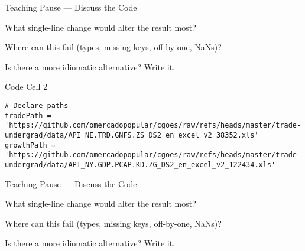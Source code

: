 \documentclass[notes,11pt, aspectratio=169, xcolor=table]{beamer}
\newenvironment{wideitemize}{\itemize\addtolength{\itemsep}{10pt}}{\enditemize}
\begin{document}
\begin{frame}{Teaching Pause — Discuss the Code}
\begin{wideitemize}
\item What single-line change would alter the result most?
\item Where can this fail (types, missing keys, off-by-one, NaNs)?
\item Is there a more idiomatic alternative? Write it.
\end{wideitemize}
\end{frame}

\begin{frame}[fragile]{Code Cell 2}
\begin{verbatim}
# Declare paths
tradePath = 'https://github.com/omercadopopular/cgoes/raw/refs/heads/master/trade-undergrad/data/API_NE.TRD.GNFS.ZS_DS2_en_excel_v2_38352.xls'
growthPath = 'https://github.com/omercadopopular/cgoes/raw/refs/heads/master/trade-undergrad/data/API_NY.GDP.PCAP.KD.ZG_DS2_en_excel_v2_122434.xls'
\end{verbatim}

\end{frame}

\begin{frame}{Teaching Pause — Discuss the Code}
\begin{wideitemize}
\item What single-line change would alter the result most?
\item Where can this fail (types, missing keys, off-by-one, NaNs)?
\item Is there a more idiomatic alternative? Write it.
\end{wideitemize}
\end{frame}
\end{document}
